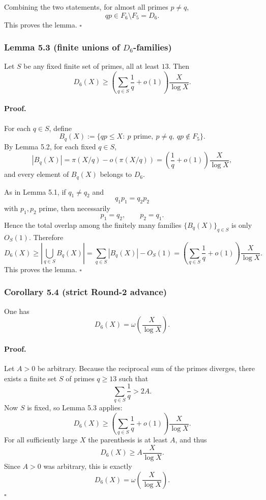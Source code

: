 Combining the two statements, for almost all primes $p\neq q$,
\[
qp\in F_6\setminus F_5=D_6.
\]
This proves the lemma. \hfill$\square$

\subsubsection*{Lemma 5.3 (finite unions of $D_6$-families)}
Let $S$ be any fixed finite set of primes, all at least $13$. Then
\[
D_6(X)\ge \left(\sum_{q\in S}\frac1q+o(1)\right)\frac{X}{\log X}.
\]

\paragraph{Proof.}
For each $q\in S$, define
\[
B_q(X):=\{qp\le X:\ p \text{ prime},\ p\neq q,\ qp\notin F_5\}.
\]
By Lemma 5.2, for each fixed $q\in S$,
\[
|B_q(X)|=\pi(X/q)-o(\pi(X/q))
       = \left(\frac1q+o(1)\right)\frac{X}{\log X},
\]
and every element of $B_q(X)$ belongs to $D_6$.

As in Lemma 5.1, if $q_1\neq q_2$ and
\[
q_1p_1=q_2p_2
\]
with $p_1,p_2$ prime, then necessarily
\[
p_1=q_2,\qquad p_2=q_1.
\]
Hence the total overlap among the finitely many families $\{B_q(X)\}_{q\in S}$ is only $O_S(1)$.
Therefore
\[
D_6(X)\ge \left|\bigcup_{q\in S} B_q(X)\right|
        = \sum_{q\in S}|B_q(X)| - O_S(1)
        = \left(\sum_{q\in S}\frac1q+o(1)\right)\frac{X}{\log X}.
\]
This proves the lemma. \hfill$\square$

\subsubsection*{Corollary 5.4 (strict Round-2 advance)}
One has
\[
D_6(X)=\omega\!\left(\frac{X}{\log X}\right).
\]

\paragraph{Proof.}
Let $A>0$ be arbitrary.
Because the reciprocal sum of the primes diverges, there exists a finite set $S$ of primes $q\ge 13$ such that
\[
\sum_{q\in S}\frac1q > 2A.
\]
Now $S$ is fixed, so Lemma 5.3 applies:
\[
D_6(X)\ge \left(\sum_{q\in S}\frac1q+o(1)\right)\frac{X}{\log X}.
\]
For all sufficiently large $X$ the parenthesis is at least $A$, and thus
\[
D_6(X)\ge A\frac{X}{\log X}.
\]
Since $A>0$ was arbitrary, this is exactly
\[
D_6(X)=\omega\!\left(\frac{X}{\log X}\right).
\]
\hfill$\square$

